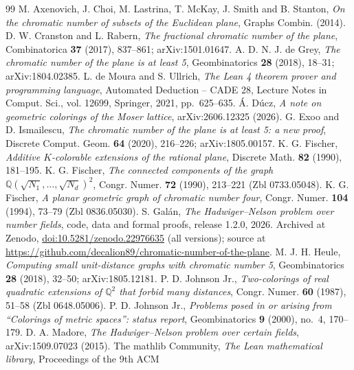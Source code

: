 \documentclass[11pt,a4paper]{amsart}
\theoremstyle{remark}
\newcommand{\Q}{\mathbb{Q}}
\begin{document}
\begin{thebibliography}{99}
 M. Axenovich, J. Choi, M. Lastrina, T. McKay, J. Smith and B. Stanton, \emph{On the chromatic
number of subsets of the Euclidean plane}, Graphs Combin. (2014).
 D. W. Cranston and L. Rabern, \emph{The fractional chromatic number of the plane},
Combinatorica \textbf{37} (2017), 837--861; arXiv:1501.01647.
 A. D. N. J. de Grey, \emph{The chromatic number of the plane is at least 5}, Geombinatorics
\textbf{28} (2018), 18--31; arXiv:1804.02385.
 L. de Moura and S. Ullrich, \emph{The Lean 4 theorem prover and programming language},
Automated Deduction -- CADE 28, Lecture Notes in Comput. Sci., vol. 12699, Springer, 2021, pp.~625--635.
 \'A. D\'ucz, \emph{A note on geometric colorings of the Moser lattice}, arXiv:2606.12325 (2026).
 G. Exoo and D. Ismailescu, \emph{The chromatic number of the plane is at least 5: a new
proof}, Discrete Comput. Geom. \textbf{64} (2020), 216--226; arXiv:1805.00157.
 K. G. Fischer, \emph{Additive $K$-colorable extensions of the rational plane}, Discrete
Math. \textbf{82} (1990), 181--195.
 K. G. Fischer, \emph{The connected components of the graph
$\Q(\sqrt{N_1},\dots,\sqrt{N_d})^2$}, Congr. Numer. \textbf{72} (1990), 213--221 (Zbl 0733.05048).
 K. G. Fischer, \emph{A planar geometric graph of chromatic number four}, Congr. Numer.
\textbf{104} (1994), 73--79 (Zbl 0836.05030).
 S. Gal\'an, \emph{The Hadwiger--Nelson problem over number fields}, code, data and formal
proofs, release 1.2.0, 2026. Archived at Zenodo,
\href{https://doi.org/10.5281/zenodo.22976635}{doi:10.5281/zenodo.22976635} (all versions); source at
\url{https://github.com/decalion89/chromatic-number-of-the-plane}.
 M. J. H. Heule, \emph{Computing small unit-distance graphs with chromatic number 5},
Geombinatorics \textbf{28} (2018), 32--50; arXiv:1805.12181.
 P. D. Johnson Jr., \emph{Two-colorings of real quadratic extensions of $\Q^2$ that forbid
many distances}, Congr. Numer. \textbf{60} (1987), 51--58 (Zbl 0648.05006).
 P. D. Johnson Jr., \emph{Problems posed in or arising from ``Colorings of metric spaces'':
status report}, Geombinatorics \textbf{9} (2000), no.~4, 170--179.
 D. A. Madore, \emph{The Hadwiger--Nelson problem over certain fields}, arXiv:1509.07023 (2015).
 The mathlib Community, \emph{The Lean mathematical library}, Proceedings of the 9th ACM

\end{thebibliography}
\end{document}
